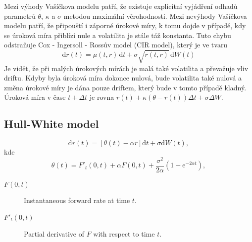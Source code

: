 \documentclass[a4paper,12pt]{report}
\theoremstyle{definition} \newtheorem{definice}[veta]{Definice}
\theoremstyle{remark}
\begin{document}
Mezi výhody Vašíčkova modelu patří, že existuje explicitní vyjádření odhadů parametrů $\theta$, $\kappa$ a  $\sigma$ metodou maximální věrohodnosti.
Mezi nevýhody Vašíčkova modelu patří, že připouští i záporné úrokové míry, k tomu dojde v případě, kdy se úroková míra přiblízí nule a volatilita je stále táž konstanta.
Tuto chybu odstraňuje Cox - Ingersoll - Rossův model (CIR model), který je ve tvaru 
\begin{equation}\label{CIR_model}
\mathrm{d}r(t) = \mu(t, r)\,\mathrm{d}t + \sigma\sqrt{r(t, r)}\,\mathrm{d}W(t)
\end{equation}
Je vidět, že při malých úrokových mírách je malá také volatilita a převažuje vliv driftu. Kdyby byla úroková míra dokonce nulová, bude volatilita také nulová a změna úrokové míry je dána pouze driftem, který bude v tomto případě kladný.
Úroková míra v čase $t + \Delta t$ je rovna $r(t) + \kappa ( \theta - r(t))\Delta t + \sigma \Delta W$.

\subsection{Hull-White model}
\begin{equation}\label{H-W_model}
 \mathrm{d}r(t)=[\theta(t)-\alpha r] \mathrm{d}t+\sigma \mathrm{d}W(t),
\end{equation}
kde
\begin{equation}
\theta(t)=F'_{t}(0,t)+\alpha F(0,t)+\frac{\sigma^2}{2 \alpha}(1- \mathrm{e}^{-2\alpha t}),
\end{equation}
\begin{description}
\item[$F(0,t)$] Instantaneous forward rate at time $t$.
\item[$F'_{t}(0,t)$] Partial derivative of $F$ with respect to time $t$.
\end{description}
\end{document}
